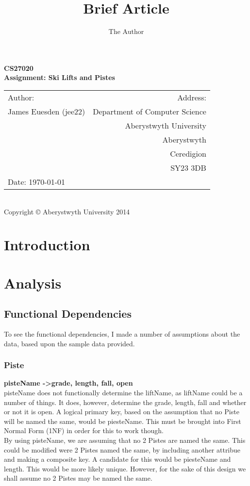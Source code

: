 \documentclass[11pt]{scrartcl} %
\title{Brief Article}
\author{The Author}
\begin{document}
\newpage

\begin{center}
\textbf{\LARGE CS27020}\\[0.5cm]

\textbf{\LARGE Assignment: Ski Lifts and Pistes }\\[13cm]

\begin{tabular}{ l | r }
{\large Author:} & {\large Address:} \\
James Euesden (jee22) &  Department of Computer Science \\
 & Aberystwyth University \\ 
 & Aberystwyth \\
 & Ceredigion \\
 & SY23 3DB \\
{\large Date:} \today  &  \\

\end{tabular} \\[0.2cm]

{\small Copyright © Aberystwyth University 2014}

\end{center}

\newpage

\tableofcontents

\newpage

\section{Introduction}

\section{Analysis}
\subsection{Functional Dependencies}
To see the functional dependencies, I made a number of assumptions about the data, based upon the sample data provided.
\subsubsection{Piste}
 \textbf{pisteName -\textgreater  grade, length, fall, open}
\\[0.1cm]
pisteName does not functionally determine the liftName, as liftName could be a number of things. It does, however, determine the grade, length, fall and whether or not it is open. A logical primary key, based on the assumption that no Piste will be named the same, would be piesteName. This must be brought into First Normal Form (1NF) in order for this to work though.\\
By using pisteName, we are assuming that no 2 Pistes are named the same. This could be modified were 2 Pistes named the same, by including another attribue and making a composite key. A candidate for this would be piesteName and length. This would be more likely unique. However, for the sake of this design we shall assume no 2 Pistes may be named the same.
\end{document}
